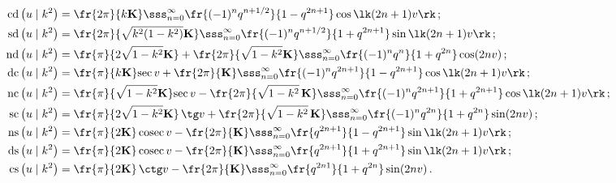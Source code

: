\vspace*{-9pt}





    \begin{align*}

    \cd \left(u\mid k^2\right) &= \fr{2\pi}{k\bK} \sss_{n=0}^\infty 

    \fr{(-1)^nq^{n+1/2}}{1-q^{2n+1}} \cos \lk (2n+1)v\rk\,;

\\

    \sd \left(u\mid k^2\right) &= \fr{2\pi}{\sqrt{k^2(1-k^2)}\bK} 

    \sss_{n=0}^\infty \fr{(-1)^n q^{n+1/2}}{1+q^{2n+1}} \sin \lk (2n+1)v\rk\,;

\\

    \nd \left(u\mid k^2\right) &= \fr{\pi}{2\sqrt{ 1-k^2}\bK} +

    \fr{2\pi}{\sqrt{1-k^2}\bK} \sss_{n=0}^\infty \fr{(-1)^nq^{n}}{1+q^{2n}} 

    \cos (2nv)\,;

\\

    \dc \left(u\mid k^2\right) &= \fr{\pi}{k\bK}\mathrm{sec}\,v +\fr{2\pi}{ \bK} 

    \sss_{n=0}^\infty \fr{(-1)^nq^{2n+1}}{1-q^{2n+1}} \cos \lk (2n+1)v\rk\,;

\\

    \nc \left(u\mid k^2\right) &= \fr{\pi}{\sqrt{1-k^2}\bK}\mathrm{sec}\, v -

    \fr{2\pi}{\sqrt{1-k^2}\, \bK} \sss_{n=0}^\infty \fr{(-1)^nq^{2n+1}}{1+q^{2n+1}} 

    \cos \lk (2n+1)v\rk\,;

\\

   \ssc \left(u\mid k^2\right) &= \fr{\pi}{2\sqrt{1-k^2}\bK}\,\tg v + 

   \fr{2\pi}{\sqrt{1-k^2}\, \bK} \sss_{n=0}^\infty 

   \fr{(-1)^nq^{2n}}{1+q^{2n}} \sin (2nv)\,;

   \\

   \ns \left(u\mid k^2\right) &= \fr{\pi}{2\bK}\,\mathrm{cosec}\, v - 

   \fr{2\pi}{\bK} \sss_{n=0}^\infty \fr{q^{2n+1}}{1-q^{2n+1}} \sin \lk (2n+1)v\rk\,;

\\

   \ds \left(u\mid k^2\right) &= \fr{\pi}{2\bK}\,\mathrm{cosec}\, v - \fr{2\pi}{\bK} 

   \sss_{n=0}^\infty \fr{q^{2n+1}}{1+q^{2n+1}} \sin \lk (2n+1)v\rk\,;

\\

       \cs \left(u\mid k^2\right) &= \fr{\pi}{2\bK}\,\ctg v - 

       \fr{2\pi}{\bK} \sss_{n=0}^\infty \fr{q^{2n1}}{1+q^{2n}} \sin  (2nv)\,.


       \end{align*}
